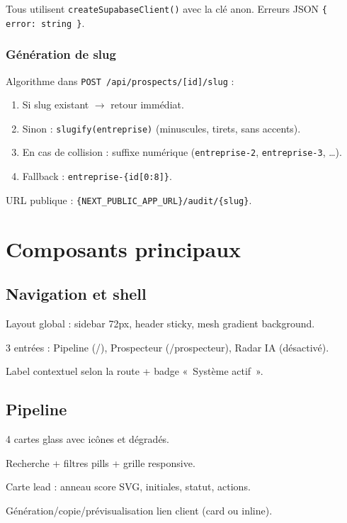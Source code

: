 \documentclass[11pt,a4paper]{report}
\begin{document}
Tous utilisent \texttt{createSupabaseClient()} avec la clé anon. Erreurs JSON \texttt{\{ error: string \}}.

\subsection{Génération de slug}

Algorithme dans \texttt{POST /api/prospects/[id]/slug} :
\begin{enumerate}[leftmargin=*]
  \item Si slug existant $\rightarrow$ retour immédiat.
  \item Sinon : \texttt{slugify(entreprise)} (minuscules, tirets, sans accents).
  \item En cas de collision : suffixe numérique (\texttt{entreprise-2}, \texttt{entreprise-3}, \ldots).
  \item Fallback : \texttt{entreprise-\{id[0:8]\}}.
\end{enumerate}

URL publique : \texttt{\{NEXT\_PUBLIC\_APP\_URL\}/audit/\{slug\}}.

\chapter{Composants principaux}

\section{Navigation et shell}

\begin{description}[style=nextline, leftmargin=3cm]
  \item[\texttt{DashboardShell}] Layout global : sidebar 72px, header sticky, mesh gradient background.
  \item[Sidebar] 3 entrées : Pipeline (/), Prospecteur (/prospecteur), Radar IA (désactivé).
  \item[Header] Label contextuel selon la route + badge «~Système actif~».
\end{description}

\section{Pipeline}

\begin{description}[style=nextline, leftmargin=3cm]
  \item[\texttt{DashboardKpi}] 4 cartes glass avec icônes et dégradés.
  \item[\texttt{ProspectsBoard}] Recherche + filtres pills + grille responsive.
  \item[\texttt{ProspectCard}] Carte lead : anneau score SVG, initiales, statut, actions.
  \item[\texttt{AuditLinkActions}] Génération/copie/prévisualisation lien client (card ou inline).
\end{description}
\end{document}
